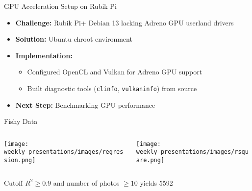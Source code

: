 \begin{frame}{GPU Acceleration Setup on Rubik Pi}
   \begin{itemize}
       \item \textbf{Challenge:} Rubik Pi+ Debian 13 lacking Adreno GPU userland drivers
       \item \textbf{Solution:} Ubuntu chroot environment 
       \item \textbf{Implementation:}
           \begin{itemize}
               \item Configured OpenCL and Vulkan for Adreno GPU support
               \item Built diagnostic tools (\texttt{clinfo}, \texttt{vulkaninfo}) from source
           \end{itemize}
       \item \textbf{Next Step:} Benchmarking GPU performance
   \end{itemize}
\end{frame}

\begin{frame}{Fishy Data}
    \begin{columns}
        \begin{column}{0.5\textwidth}
            \texttt{[image: weekly\_presentations/images/regression.png]}
        \end{column}
        \begin{column}{0.5\textwidth}
            \texttt{[image: weekly\_presentations/images/rsquare.png]}
        \end{column}
    \end{columns}

    \vspace{0.2em} %
    \begin{center}
        {\small Cutoff $R^2\geq 0.9$ and number of photos $\geq 10$ yields 5592}
    \end{center}
\end{frame}

